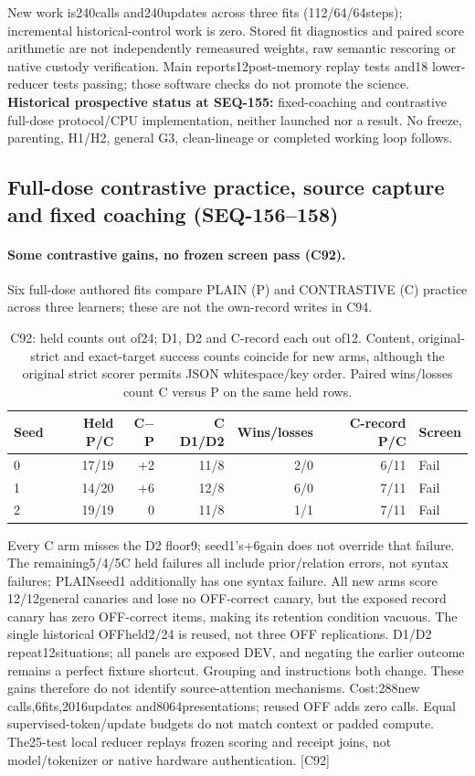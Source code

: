 \documentclass{article}
\begin{document}
New work is240calls and240updates across three fits (112/64/64steps);
incremental historical-control work is zero. Stored fit diagnostics and paired
score arithmetic are not independently remeasured weights, raw semantic rescoring
or native custody verification. Main reports12post-memory replay tests and18
lower-reducer tests passing; those software checks do not promote the science.
\textbf{Historical prospective status at SEQ-155:} fixed-coaching and contrastive full-dose
protocol/CPU implementation, neither launched nor a result. No freeze, parenting,
H1/H2, general G3, clean-lineage or completed working loop follows. 


\subsection{Full-dose contrastive practice, source capture and fixed coaching (SEQ-156--158)}
\label{sec:seq158-extension}

\paragraph{Some contrastive gains, no frozen screen pass (C92).}
Six full-dose authored fits compare PLAIN (P) and CONTRASTIVE (C) practice
across three learners; these are not the own-record writes in C94.
\begin{table}[htbp]
\centering\small
\begin{tabular}{lrrrrrl}
\toprule
Seed & Held P/C & C$-$P & C D1/D2 & Wins/losses & C-record P/C & Screen \\
\midrule
0 & 17/19 & +2 & 11/8 & 2/0 & 6/11 & Fail \\
1 & 14/20 & +6 & 12/8 & 6/0 & 7/11 & Fail \\
2 & 19/19 & 0 & 11/8 & 1/1 & 7/11 & Fail \\
\bottomrule
\end{tabular}
\caption{C92: held counts out of24; D1, D2 and C-record each out of12.
Content, original-strict and exact-target success counts coincide for new arms,
although the original strict scorer permits JSON whitespace/key order.
Paired wins/losses count C versus P on the same held rows.}
\label{tab:seq156-contrastive}
\end{table}
Every C arm misses the D2 floor9; seed1's+6gain does not override that failure.
The remaining5/4/5C held failures all include prior/relation errors, not syntax
failures; PLAINseed1 additionally has one syntax failure. All new arms score
12/12general canaries and lose no OFF-correct canary, but the exposed record
canary has zero OFF-correct items, making its retention condition vacuous.
The single historical OFFheld2/24 is reused, not three OFF replications.
D1/D2 repeat12situations; all panels are exposed DEV, and negating the earlier
outcome remains a perfect fixture shortcut. Grouping and instructions both
change. These gains therefore do not identify source-attention mechanisms.
Cost:288new calls,6fits,2016updates and8064presentations; reused OFF adds zero
calls. Equal supervised-token/update budgets do not match context or padded
compute. The25-test local reducer replays frozen scoring and receipt joins,
not model/tokenizer or native hardware authentication. [C92]
\end{document}
